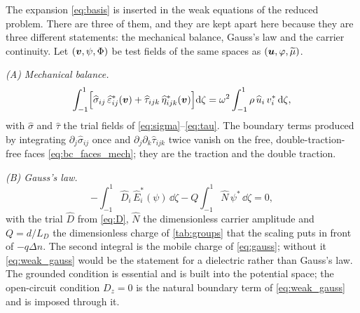 The expansion \eqref{eq:basis} is inserted in the weak equations of the reduced
problem.  There are three of them, and they are kept apart here because they are
three different statements: the mechanical balance, Gauss's law and the carrier
continuity.  Let $(\boldsymbol{v},\psi,\Phi)$ be test fields of the same spaces as
$(\boldsymbol{u},\varphi,\widetilde\mu)$.

\emph{(A) Mechanical balance.}
\begin{equation}
\label{eq:weak_mech}
\int_{-1}^{1}\Bigl[\widehat\sigma_{ij}\,\widehat\varepsilon^{*}_{ij}(\boldsymbol{v})
+\widehat\tau_{ijk}\,\widehat\eta^{*}_{ijk}(\boldsymbol{v})\Bigr]\mathrm{d}\zeta
=\omega^{2}\int_{-1}^{1}\rho\,\widehat u_i\,v_i^{*}\,\mathrm{d}\zeta ,
\end{equation}
with $\widehat\sigma$ and $\widehat\tau$ the trial fields of
\eqref{eq:sigma}--\eqref{eq:tau}.  The boundary terms produced by integrating
$\partial_j\widehat\sigma_{ij}$ once and $\partial_j\partial_k\widehat\tau_{ijk}$
twice vanish on the free, double-traction-free faces
\eqref{eq:bc_faces_mech}; they are the traction and the double traction.

\emph{(B) Gauss's law.}
\begin{equation}
\label{eq:weak_gauss}
-\int_{-1}^{1}\widehat D_i\,\widehat E_i^{*}(\psi)\,\dd\zeta
-Q\int_{-1}^{1}\widehat N\,\psi^{*}\,\dd\zeta=0 ,
\end{equation}
with the trial $\widehat D$ from \eqref{eq:D}, $\widehat N$ the dimensionless
carrier amplitude and $Q=d/L_D$ the dimensionless charge of \cref{tab:groups}
that the scaling puts in front of $-q\Delta n$.
The second integral is the mobile charge of \eqref{eq:gauss};
without it \eqref{eq:weak_gauss} would be the statement for a dielectric rather
than Gauss's law.  The grounded condition is essential and is built into the
potential space; the open-circuit condition $D_z=0$ is the natural boundary term
of \eqref{eq:weak_gauss} and is imposed through it.

